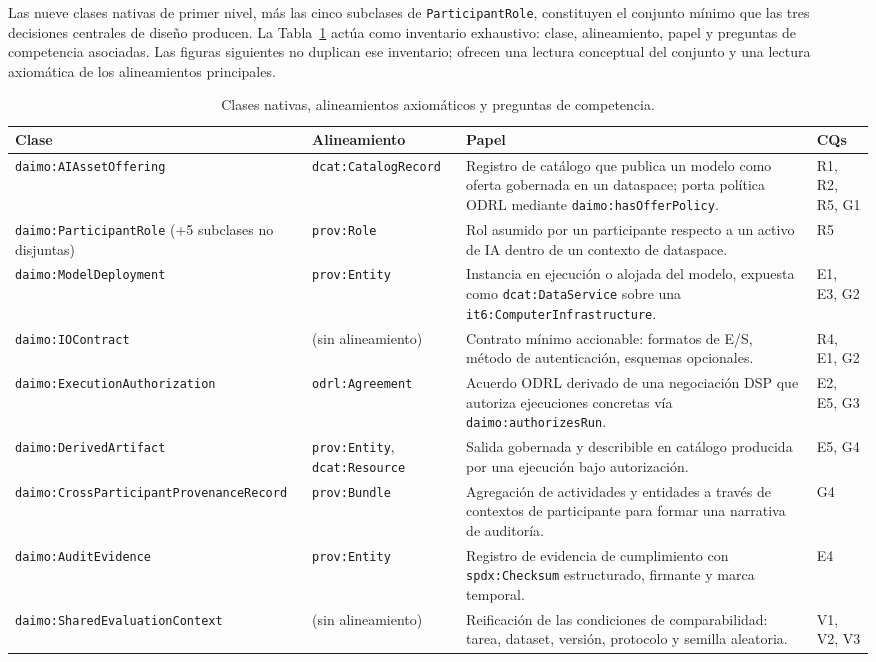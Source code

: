 \documentclass[Afour,sagev,times]{sagej}
\newcommand{\code}[1]{\texttt{#1}}
\begin{document}
Las nueve clases nativas de primer nivel, más las cinco subclases de \code{ParticipantRole}, constituyen el conjunto mínimo que las tres decisiones centrales de diseño producen. La Tabla~\ref{tab:classes} actúa como inventario exhaustivo: clase, alineamiento, papel y preguntas de competencia asociadas. Las figuras siguientes no duplican ese inventario; ofrecen una lectura conceptual del conjunto y una lectura axiomática de los alineamientos principales.

\begin{table}[tb]
\scriptsize\sf\centering
\caption{Clases nativas, alineamientos axiomáticos y preguntas de competencia.\label{tab:classes}}
\begin{tabular}{@{}p{4cm}p{3cm}p{6cm}p{2.2cm}@{}}
\toprule
\textbf{Clase} & \textbf{Alineamiento} & \textbf{Papel} & \textbf{CQs} \\
\midrule
\code{daimo:AIAsset}\newline\code{Offering} & \code{dcat:CatalogRecord} & Registro de catálogo que publica un modelo como oferta gobernada en un dataspace; porta política ODRL mediante \code{daimo:hasOfferPolicy}. & R1, R2, R5, G1 \\
\code{daimo:ParticipantRole} \newline (+5 subclases no disjuntas) & \code{prov:Role} & Rol asumido por un participante respecto a un activo de IA dentro de un contexto de dataspace. & R5 \\
\code{daimo:Model}\newline\code{Deployment} & \code{prov:Entity} & Instancia en ejecución o alojada del modelo, expuesta como \code{dcat:DataService} sobre una \code{it6:ComputerInfrastructure}. & E1, E3, G2 \\
\code{daimo:IOContract} & (sin alineamiento) & Contrato mínimo accionable: formatos de E/S, método de autenticación, esquemas opcionales. & R4, E1, G2 \\
\code{daimo:Execution}\newline\code{Authorization} & \code{odrl:Agreement} & Acuerdo ODRL derivado de una negociación DSP que autoriza ejecuciones concretas vía \code{daimo:authorizesRun}. & E2, E5, G3 \\
\code{daimo:DerivedArtifact} & \code{prov:Entity}, \code{dcat:Resource} & Salida gobernada y describible en catálogo producida por una ejecución bajo autorización. & E5, G4 \\
\code{daimo:CrossParticipant}\newline\code{ProvenanceRecord} & \code{prov:Bundle} & Agregación de actividades y entidades a través de contextos de participante para formar una narrativa de auditoría. & G4 \\
\code{daimo:AuditEvidence} & \code{prov:Entity} & Registro de evidencia de cumplimiento con \code{spdx:Checksum} estructurado, firmante y marca temporal. & E4 \\
\code{daimo:SharedEvaluation}\newline\code{Context} & (sin alineamiento) & Reificación de las condiciones de comparabilidad: tarea, dataset, versión, protocolo y semilla aleatoria. & V1, V2, V3 \\
\bottomrule
\end{tabular}
\end{table}
\end{document}
